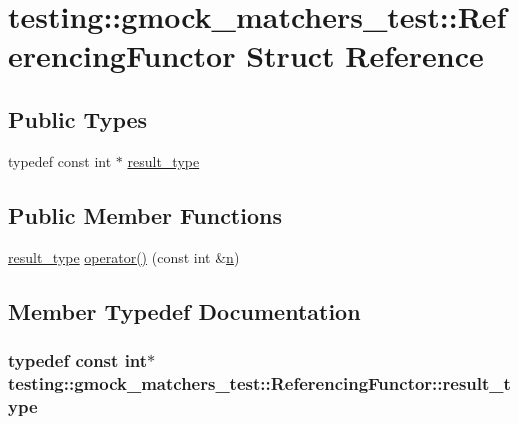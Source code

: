 \hypertarget{structtesting_1_1gmock__matchers__test_1_1ReferencingFunctor}{}\section{testing\+:\+:gmock\+\_\+matchers\+\_\+test\+:\+:Referencing\+Functor Struct Reference}
\label{structtesting_1_1gmock__matchers__test_1_1ReferencingFunctor}
\subsection*{Public Types}
\begin{DoxyCompactItemize}
\item 
typedef const int $\ast$ \hyperlink{structtesting_1_1gmock__matchers__test_1_1ReferencingFunctor_a5856a8175e2f797a6733a363b2834094}{result\+\_\+type}
\end{DoxyCompactItemize}
\subsection*{Public Member Functions}
\begin{DoxyCompactItemize}
\item 
\hyperlink{structtesting_1_1gmock__matchers__test_1_1ReferencingFunctor_a5856a8175e2f797a6733a363b2834094}{result\+\_\+type} \hyperlink{structtesting_1_1gmock__matchers__test_1_1ReferencingFunctor_a149f15ed9afbff28f5c3639c0f3eb255}{operator()} (const int \&\hyperlink{app_2main_8cpp_acfc02ec89670db29251fda6a66602ce2}{n})
\end{DoxyCompactItemize}


\subsection{Member Typedef Documentation}
\subsubsection[{\texorpdfstring{result\+\_\+type}{result_type}}]{\setlength{\rightskip}{0pt plus 5cm}typedef const int$\ast$ {\bf testing\+::gmock\+\_\+matchers\+\_\+test\+::\+Referencing\+Functor\+::result\+\_\+type}}\hypertarget{structtesting_1_1gmock__matchers__test_1_1ReferencingFunctor_a5856a8175e2f797a6733a363b2834094}{}\label{structtesting_1_1gmock__matchers__test_1_1ReferencingFunctor_a5856a8175e2f797a6733a363b2834094}


